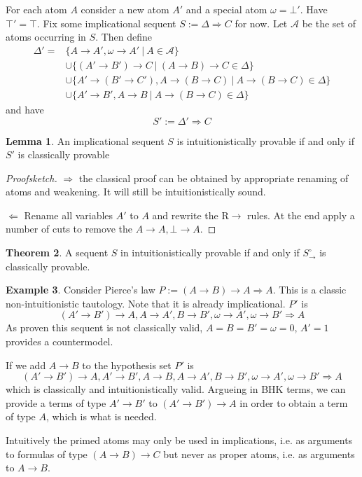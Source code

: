 \documentclass[a4paper,12pt]{article}
\theoremstyle{definition}
\newtheorem{theorem}{Theorem}[section]
\theoremstyle{definition}
\theoremstyle{definition}
\newtheorem{lemma}[theorem]{Lemma}
\theoremstyle{definition}
\theoremstyle{definition}
\theoremstyle{definition}
\newtheorem{example}[theorem]{Example}
\begin{document}
	For each atom $A$ consider a new atom $A'$ and a special atom $\omega = \bot'$. Have $\top' = \top$. Fix some implicational sequent $S := \Delta\Rightarrow C$ for now. Let $\mathcal{A}$ be the set of atoms occurring in $S$. Then define 
	\begin{align*}
		\Delta' = &\{A\to A', \omega\to A'\:|\:A\in\mathcal{A}\}
		\\&\cup \{(A'\to B')\to C\:|\: (A\to B)\to C\in\Delta\}
		\\&\cup \{A'\to (B'\to C'), A\to(B\to C)\:|\: A\to (B\to C)\in\Delta\}
		\\&\cup \{A'\to B', A\to B\:|\: A\to (B\to C)\in\Delta\}
	\end{align*}
and have $$S' := \Delta' \Rightarrow C$$

	\begin{lemma}
		An implicational sequent $S$ is intuitionistically provable if and only if $S'$ is classically provable
	\end{lemma}
	
	\begin{proof}[Proofsketch]
		
		$\Rightarrow$ the classical proof can be obtained by appropriate renaming of atoms and weakening. It will still be intuitionistically sound.
		
		$\Leftarrow$ Rename all variables $A'$ to $A$ and rewrite the R$\to$ rules. At the end apply a number of cuts to remove the $A\to A,\bot\to A$.
		
	\end{proof}

	\begin{theorem}
		A sequent $S$ in intuitionistically provable if and only if $S^\circ_\to$ is classically provable.
	\end{theorem}

	\begin{example}
		Consider Pierce's law $P := (A\to B)\to A\Rightarrow A$. This is a classic non-intuitionistic tautology. Note that it is already implicational. $P'$ is $$(A'\to B')\to A, A\to A', B\to B', \omega\to A', \omega\to B'\Rightarrow A$$ As proven this sequent is not classically valid, $A = B = B' = \omega = 0$, $A' = 1$  provides a countermodel.
		
		If we add $A\to B$ to the hypothesis set $P'$ is $$(A'\to B')\to A, A'\to B', A\to B, A\to A', B\to B', \omega\to A', \omega\to B'\Rightarrow A$$ which is classically and intuitionistically valid. Argueing in BHK terms, we can provide a terms of type $A'\to B'$ to $(A'\to B')\to A$ in order to obtain a term of type $A$, which is what is needed.
	\end{example}

	Intuitively the primed atoms may only be used in implications, i.e. as arguments to formulas of type $(A\to B)\to C$ but never as proper atoms, i.e. as arguments to $A\to B$.
	
	
	
	
\end{document}
